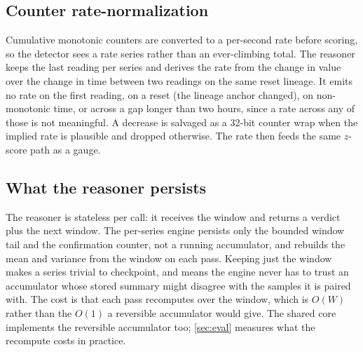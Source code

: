 \subsection{Counter rate-normalization}
Cumulative monotonic counters are converted to a per-second rate before scoring, so
the detector sees a rate series rather than an ever-climbing total. The reasoner
keeps the last reading per series and derives the rate from the change in value
over the change in time between two readings on the same reset lineage. It emits no
rate on the first reading, on a reset (the lineage anchor changed), on
non-monotonic time, or across a gap longer than two hours, since a rate across any
of those is not meaningful. A decrease is salvaged as a 32-bit counter wrap when
the implied rate is plausible and dropped otherwise. The rate then feeds the same
$z$-score path as a gauge.

\subsection{What the reasoner persists}
The reasoner is stateless per call: it receives the window and returns a verdict
plus the next window. The per-series engine persists only the bounded window tail
and the confirmation counter, not a running accumulator, and rebuilds the mean and
variance from the window on each pass. Keeping just the window makes a series
trivial to checkpoint, and means the engine never has to trust an accumulator whose
stored summary might disagree with the samples it is paired with. The cost is that
each pass recomputes over the window, which is $O(W)$ rather than the $O(1)$ a
reversible accumulator would give. The shared core implements the reversible
accumulator too; \cref{sec:eval} measures what the recompute costs in practice.
